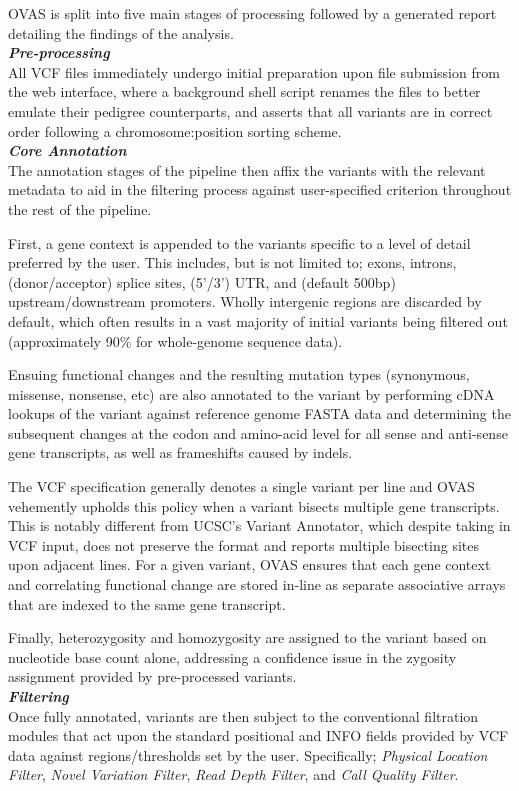 \documentclass[twocolumn]{bmcart}%
\def\app{OVAS}
\newcommand{\triplesub}[2]{\noindent\textsl{#1}\\#2\\}  %
\newcommand{\changes}[1]{{\color{red} #1}}
\begin{document}
\changes{
\app{} is split into five main stages of processing followed by a generated report detailing the findings of the analysis.\\

\triplesub{\bf Pre-processing}{All VCF files immediately undergo initial preparation upon file submission from the web interface, where a background shell script renames the files to better emulate their pedigree counterparts, and asserts that all variants are in correct order following a chromosome:position sorting scheme.}

\triplesub{\bf Core Annotation}{
The annotation stages of the pipeline then affix the variants with the relevant metadata to aid in the filtering process against user-specified criterion throughout the rest of the pipeline.

First, a gene context is appended to the variants specific to a level of detail preferred by the user. This includes, but is not limited to; exons, introns, (donor/acceptor) splice sites, (5'/3') UTR, and (default 500bp) upstream/downstream promoters. Wholly intergenic regions are discarded by default, which often results in a vast majority of initial variants being filtered out (approximately 90\% for whole-genome sequence data).

Ensuing functional changes and the resulting mutation types (synonymous, missense, nonsense, etc) are also annotated to the variant by performing cDNA lookups of the variant against reference genome FASTA data and determining the subsequent changes at the codon and amino-acid level for all sense and anti-sense gene transcripts, as well as frameshifts caused by indels.

The VCF specification generally denotes a single variant per line and OVAS vehemently upholds this policy when a variant bisects multiple gene transcripts. This is notably different from UCSC's Variant Annotator, which despite taking in VCF input, does not preserve the format and reports multiple bisecting sites upon adjacent lines. For a given variant, OVAS ensures that each gene context and correlating functional change are stored in-line as separate associative arrays that are indexed to the same gene transcript.

Finally, heterozygosity and homozygosity are assigned to the variant based on nucleotide base count alone, addressing a confidence issue in the zygosity assignment provided by pre-processed variants.
}

\triplesub{\bf Filtering}{
Once fully annotated, variants are then subject to the conventional filtration modules that act upon the standard positional and INFO fields provided by VCF data against regions/thresholds set by the user. Specifically; \textit{Physical Location Filter}, \textit{Novel Variation Filter}, \textit{Read Depth Filter}, and \textit{Call Quality Filter}.

}}
\end{document}
